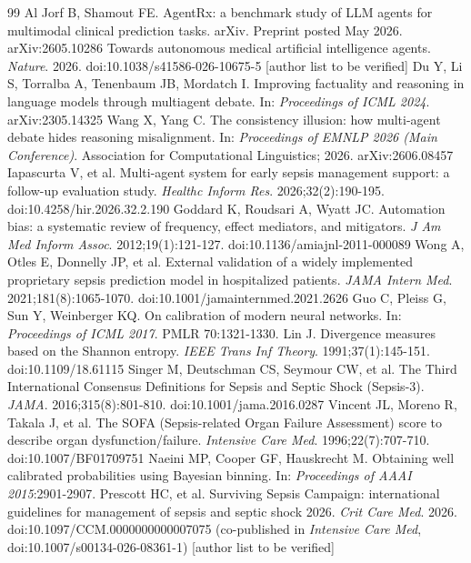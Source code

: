 \documentclass[11pt]{article}
\begin{document}
\renewcommand{\refname}{References}
\begin{thebibliography}{99}\small\setlength{\itemsep}{1pt}
 Al Jorf B, Shamout FE. AgentRx: a benchmark study of LLM agents for multimodal clinical prediction tasks. arXiv. Preprint posted May 2026. arXiv:2605.10286
 Towards autonomous medical artificial intelligence agents. \textit{Nature}. 2026. doi:10.1038/s41586-026-10675-5 [author list to be verified]
 Du Y, Li S, Torralba A, Tenenbaum JB, Mordatch I. Improving factuality and reasoning in language models through multiagent debate. In: \textit{Proceedings of ICML 2024}. arXiv:2305.14325
 Wang X, Yang C. The consistency illusion: how multi-agent debate hides reasoning misalignment. In: \textit{Proceedings of EMNLP 2026 (Main Conference)}. Association for Computational Linguistics; 2026. arXiv:2606.08457
 Iapascurta V, et al. Multi-agent system for early sepsis management support: a follow-up evaluation study. \textit{Healthc Inform Res}. 2026;32(2):190-195. doi:10.4258/hir.2026.32.2.190
 Goddard K, Roudsari A, Wyatt JC. Automation bias: a systematic review of frequency, effect mediators, and mitigators. \textit{J Am Med Inform Assoc}. 2012;19(1):121-127. doi:10.1136/amiajnl-2011-000089
 Wong A, Otles E, Donnelly JP, et al. External validation of a widely implemented proprietary sepsis prediction model in hospitalized patients. \textit{JAMA Intern Med}. 2021;181(8):1065-1070. doi:10.1001/jamainternmed.2021.2626
 Guo C, Pleiss G, Sun Y, Weinberger KQ. On calibration of modern neural networks. In: \textit{Proceedings of ICML 2017}. PMLR 70:1321-1330.
 Lin J. Divergence measures based on the Shannon entropy. \textit{IEEE Trans Inf Theory}. 1991;37(1):145-151. doi:10.1109/18.61115
 Singer M, Deutschman CS, Seymour CW, et al. The Third International Consensus Definitions for Sepsis and Septic Shock (Sepsis-3). \textit{JAMA}. 2016;315(8):801-810. doi:10.1001/jama.2016.0287
 Vincent JL, Moreno R, Takala J, et al. The SOFA (Sepsis-related Organ Failure Assessment) score to describe organ dysfunction/failure. \textit{Intensive Care Med}. 1996;22(7):707-710. doi:10.1007/BF01709751
 Naeini MP, Cooper GF, Hauskrecht M. Obtaining well calibrated probabilities using Bayesian binning. In: \textit{Proceedings of AAAI 2015}:2901-2907.
 Prescott HC, et al. Surviving Sepsis Campaign: international guidelines for management of sepsis and septic shock 2026. \textit{Crit Care Med}. 2026. doi:10.1097/CCM.0000000000007075 (co-published in \textit{Intensive Care Med}, doi:10.1007/s00134-026-08361-1) [author list to be verified]

\end{thebibliography}
\end{document}
